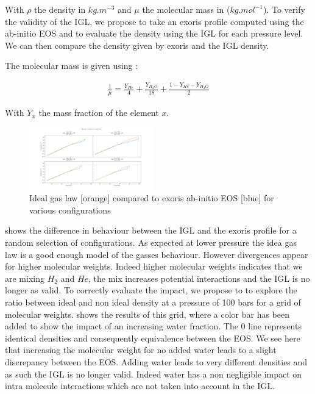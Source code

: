 With $\rho$ the density in $kg.m^{-3}$ and $\mu$ the molecular mass in ($kg.mol^{-1}$). To verify the validity of the IGL, we propose to take an exoris profile computed using the ab-initio EOS and to evaluate the density using the IGL for each pressure level. We can then compare the density given by exoris and the IGL density.

The molecular mass is given using :

\begin{align} 
    \frac{1}{\mu} = \frac{Y_{He}}{4} + \frac{Y_{H_2O}}{18} + \frac{1-Y_{He}-Y_{H_2O}}{2} \label{eq:IGL2}
\end{align}

With $Y_x$ the mass fraction of the element $x$.

\begin{figure}
    \centering
    \includegraphics[width=0.48\textwidth]{Images/EOS_comparaison.png}
    \caption{Ideal gas law [orange] compared to exoris ab-initio EOS [blue] for various configurations}
    \label{fig:EOS_comp}
\end{figure}

 shows the difference in behaviour between the IGL and the exoris profile for a random selection of configurations. As expected at lower pressure the idea gas law is a good enough model of the gasses behaviour. However divergences appear for higher molecular weights. Indeed higher molecular weights indicates that we are mixing $H_2$ and $He$, the mix increases potential interactions and the IGL is no longer as valid. To correctly evaluate the impact, we propose to to explore the ratio between ideal and non ideal density at a pressure of 100 bars for a grid of molecular weights.  shows the results of this grid, where a color bar has been added to show the impact of an increasing water fraction. The 0 line represents identical densities and consequently equivalence between the EOS. We see here that increasing the molecular weight for no added water leads to a slight discrepancy between the EOS. Adding water leads to very different densities and as such the IGL is no longer valid. Indeed water has a non negligible impact on intra molecule interactions which are not taken into account in the IGL.

